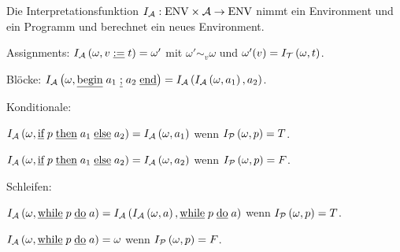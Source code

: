 \begin{defn}
Die Interpretationsfunktion $I_{\lng{A}}: \text{ENV} \times \lng{A} \to \text{ENV}$ nimmt ein Environment und ein Programm und berechnet ein neues Environment.
\begin{\whichenum}
\item Assignments: $\Iu{A}{\omega}{v \; \tu{:=} \; t} = \omega'$ mit $\omega' \sim_{v} \omega$ und $\omega'(v)=\Iu{T}{\omega}{t}$.
\item Blöcke: $\Iu{A}{\omega}{\tu{begin} \; a_1 \; \tu{;} \; a_2 \; \tu{end}} = \Iu{A}{\Iu{A}{\omega}{a_1}}{a_2}$.
\item Konditionale:
\begin{\whichenum}
\item $\Iu{A}{\omega}{\tu{if} \; p \; \tu{then} \; a_1 \; \tu{else} \; a_2} = \Iu{A}{\omega}{a_1}$ wenn $\Iu{P}{\omega}{p}=T$.
\item $\Iu{A}{\omega}{\tu{if} \; p \; \tu{then} \; a_1 \; \tu{else} \; a_2} = \Iu{A}{\omega}{a_2}$ wenn $\Iu{P}{\omega}{p}=F$.
\end{\whichenum}
\item Schleifen:
\begin{\whichenum}
\item $\Iu{A}{\omega}{\tu{while} \; p \; \tu{do} \; a} = \Iu{A}{\Iu{A}{\omega}{a}}{\tu{while} \; p \; \tu{do} \; a}$ wenn $\Iu{P}{\omega}{p}=T$.
\item $\Iu{A}{\omega}{\tu{while} \; p \; \tu{do} \; a} = \omega$ wenn $\Iu{P}{\omega}{p}=F$.
\end{\whichenum}
\end{\whichenum}
\end{defn}

